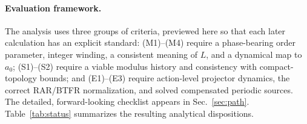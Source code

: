 \documentclass[aps,prd,reprint,superscriptaddress,nofootinbib,floatfix,showkeys]{revtex4-2}
\newcommand{\azero}{a_{0}}
\begin{document}
\paragraph{Evaluation framework.}
The analysis uses three groups of criteria, previewed here so that each later
calculation has an explicit standard: (M1)--(M4) require a phase-bearing order
parameter, integer winding, a consistent meaning of \(L\), and a dynamical map
to \(\azero\); (S1)--(S2) require a viable modulus history and consistency with
compact-topology bounds; and (E1)--(E3) require action-level projector dynamics,
the correct RAR/BTFR normalization, and solved compensated periodic sources.
The detailed, forward-looking checklist appears in Sec.~\ref{sec:path}.
Table~\ref{tab:status} summarizes the resulting analytical dispositions.

\onecolumngrid
\vspace{0.9em}
\label{tab:status}
\noindent
\end{document}
